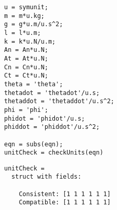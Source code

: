 \begin{lstlisting}[frame=lines,style=Matlab-editor]
% Checking EOM Units
u = symunit;
m = m*u.kg;
g = g*u.m/u.s^2;
l = l*u.m;
k = k*u.N/u.m;
An = An*u.N;
At = At*u.N;
Cn = Cn*u.N;
Ct = Ct*u.N;
theta = 'theta';
thetadot = 'thetadot'/u.s;
thetaddot = 'thetaddot'/u.s^2;
phi = 'phi';
phidot = 'phidot'/u.s;
phiddot = 'phiddot'/u.s^2;

eqn = subs(eqn);
unitCheck = checkUnits(eqn)
\end{lstlisting}
\color{gray} \begin{verbatim}
unitCheck =
  struct with fields:

    Consistent: [1 1 1 1 1 1]
    Compatible: [1 1 1 1 1 1]
\end{verbatim} \color{black}
